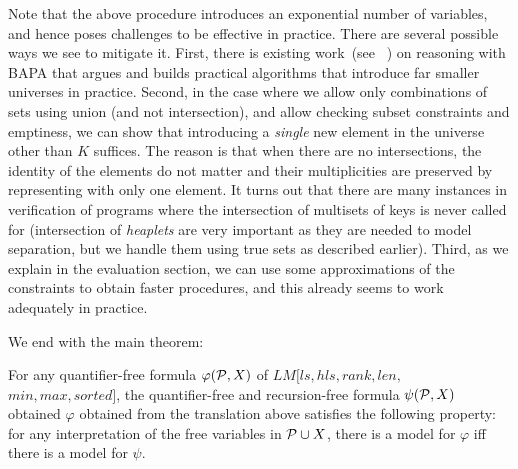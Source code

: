 Note that the above procedure introduces an exponential number of variables, and hence poses challenges
to be effective in practice. There are several possible ways we see to mitigate it. 
First, there is existing work~(see ~\cite{}) on reasoning with BAPA that argues and builds practical 
algorithms that introduce far smaller universes in practice. Second, in the case where we allow only
combinations of sets using union (and not intersection), and allow checking subset constraints and emptiness,
we can show that introducing a \emph{single} new element in the universe other than $K$ suffices. The reason
is that when there are no intersections, the identity of the elements do not matter and their multiplicities
are preserved by representing with only one element. It turns out that there are many instances in verification
of programs where the intersection of multisets of keys is never called for (intersection of \emph{heaplets} are
very important as they are needed to model separation, but we handle them using true sets as described earlier).
Third, as we explain in the evaluation section, we can use some approximations of the constraints to obtain
faster procedures, and this already seems to work adequately in practice.

We end with the main theorem:
\begin{theorem}
	For any quantifier-free formula $\varphi({\cal P}, X)$ of $LM[ls, hls, rank, len, $\\$min, max, sorted]$, the quantifier-free and recursion-free
	formula $\psi({\cal P}, X)$ obtained $\varphi$ obtained from the translation above
	satisfies the following property: for any interpretation of the free variables
	in ${\cal P} \cup X$, there is a model for $\varphi$ iff there is a model for $\psi$.
\end{theorem}

